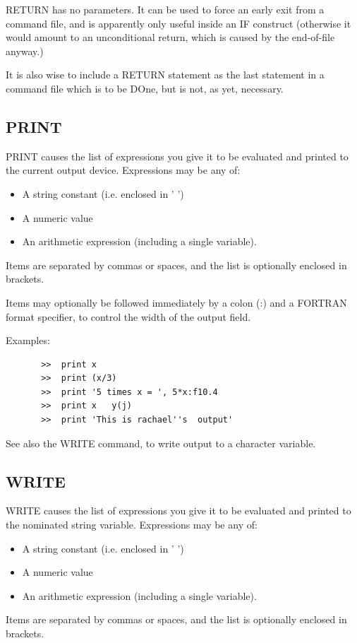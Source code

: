 \documentclass[11pt,twoside]{report}
\begin{document}
RETURN has no parameters. It can be used to force an early exit from a
command file, and is apparently only useful inside an IF construct (otherwise
it would amount to an unconditional return, which is caused by the end-of-file
anyway.)

It is also wise to include a RETURN statement as the last statement in a command
file which is to be DOne, but is not, as yet, necessary.

\subsection{PRINT}

PRINT causes the list of expressions you give it to be evaluated and printed to
the current output device. Expressions may be any of:
\begin{itemize}
\item    A string constant (i.e. enclosed in ' ')
\item    A numeric value
\item    An arithmetic expression (including a single variable).
\end{itemize}
Items are separated by commas or spaces, and the list is optionally enclosed
in brackets.

Items may optionally be followed immediately by a colon (:\index{:}) and a
FORTRAN format specifier, to control the width of the
output field.

Examples:
\begin{verbatim}
       >>  print x
       >>  print (x/3)
       >>  print '5 times x = ', 5*x:f10.4
       >>  print x   y(j)
       >>  print 'This is rachael''s  output'
\end{verbatim}

See also the WRITE command, to write output to a character variable.

\subsection{WRITE}

WRITE causes the list of expressions you give it to be evaluated and printed to
the nominated string variable. Expressions may be any of:
\begin{itemize}
\item    A string constant (i.e. enclosed in ' ')
\item    A numeric value
\item    An arithmetic expression (including a single variable).
\end{itemize}
Items are separated by commas or spaces, and the list is optionally enclosed
in brackets.
\end{document}
